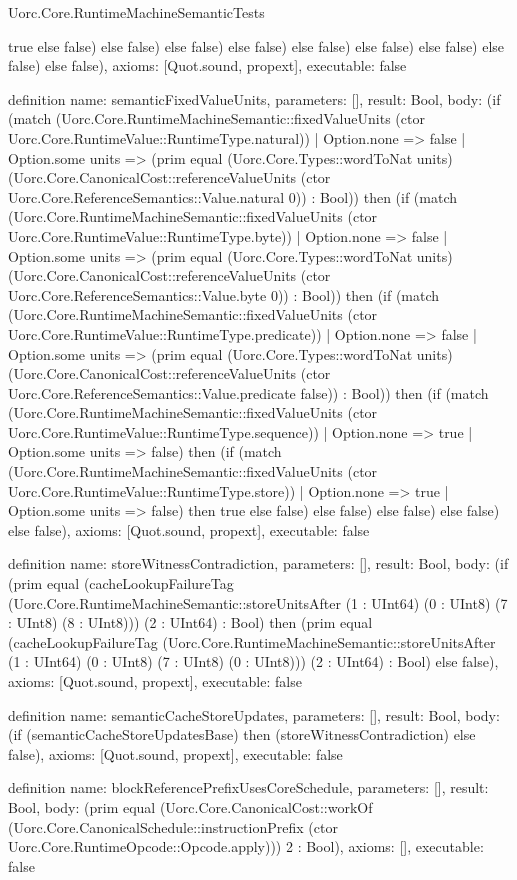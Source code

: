 \begin{lexlean}{Uorc.Core.RuntimeMachineSemanticTests}
\begin{semanticmodule}
{true else false) else false) else false) else false) else false) else false) else false) else false) else false),
  axioms: [Quot.sound, propext],
  executable: false
}

definition{
  name: semanticFixedValueUnits,
  parameters: [],
  result: Bool,
  body: (if (match (Uorc.Core.RuntimeMachineSemantic::fixedValueUnits (ctor Uorc.Core.RuntimeValue::RuntimeType.natural))
    | Option.none => false
    | Option.some units => (prim equal (Uorc.Core.Types::wordToNat units) (Uorc.Core.CanonicalCost::referenceValueUnits (ctor Uorc.Core.ReferenceSemantics::Value.natural 0)) : Bool)) then (if (match (Uorc.Core.RuntimeMachineSemantic::fixedValueUnits (ctor Uorc.Core.RuntimeValue::RuntimeType.byte))
    | Option.none => false
    | Option.some units => (prim equal (Uorc.Core.Types::wordToNat units) (Uorc.Core.CanonicalCost::referenceValueUnits (ctor Uorc.Core.ReferenceSemantics::Value.byte 0)) : Bool)) then (if (match (Uorc.Core.RuntimeMachineSemantic::fixedValueUnits (ctor Uorc.Core.RuntimeValue::RuntimeType.predicate))
    | Option.none => false
    | Option.some units => (prim equal (Uorc.Core.Types::wordToNat units) (Uorc.Core.CanonicalCost::referenceValueUnits (ctor Uorc.Core.ReferenceSemantics::Value.predicate false)) : Bool)) then (if (match (Uorc.Core.RuntimeMachineSemantic::fixedValueUnits (ctor Uorc.Core.RuntimeValue::RuntimeType.sequence))
    | Option.none => true
    | Option.some units => false) then (if (match (Uorc.Core.RuntimeMachineSemantic::fixedValueUnits (ctor Uorc.Core.RuntimeValue::RuntimeType.store))
    | Option.none => true
    | Option.some units => false) then true else false) else false) else false) else false) else false),
  axioms: [Quot.sound, propext],
  executable: false
}

definition{
  name: storeWitnessContradiction,
  parameters: [],
  result: Bool,
  body: (if (prim equal (cacheLookupFailureTag (Uorc.Core.RuntimeMachineSemantic::storeUnitsAfter (1 : UInt64) (0 : UInt8) (7 : UInt8) (8 : UInt8))) (2 : UInt64) : Bool) then (prim equal (cacheLookupFailureTag (Uorc.Core.RuntimeMachineSemantic::storeUnitsAfter (1 : UInt64) (0 : UInt8) (7 : UInt8) (0 : UInt8))) (2 : UInt64) : Bool) else false),
  axioms: [Quot.sound, propext],
  executable: false
}

definition{
  name: semanticCacheStoreUpdates,
  parameters: [],
  result: Bool,
  body: (if (semanticCacheStoreUpdatesBase) then (storeWitnessContradiction) else false),
  axioms: [Quot.sound, propext],
  executable: false
}

definition{
  name: blockReferencePrefixUsesCoreSchedule,
  parameters: [],
  result: Bool,
  body: (prim equal (Uorc.Core.CanonicalCost::workOf (Uorc.Core.CanonicalSchedule::instructionPrefix (ctor Uorc.Core.RuntimeOpcode::Opcode.apply))) 2 : Bool),
  axioms: [],
  executable: false
}


\end{semanticmodule}
\end{lexlean}
